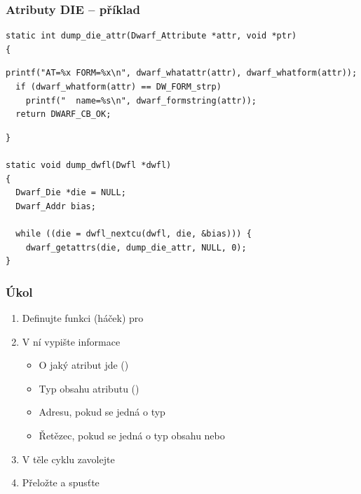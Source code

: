 \begin{frame}[fragile]
  \frametitle{Atributy DIE -- příklad}

  \begin{lstlisting}[belowskip=0pt]
static int dump_die_attr(Dwarf_Attribute *attr, void *ptr)
{
  \end{lstlisting}
  \begin{lstlisting}[aboveskip=0pt,belowskip=0pt]
  printf("AT=%x FORM=%x\n", dwarf_whatattr(attr), dwarf_whatform(attr));
  if (dwarf_whatform(attr) == DW_FORM_strp)
    printf("  name=%s\n", dwarf_formstring(attr));
  return DWARF_CB_OK;
  \end{lstlisting}
  \begin{lstlisting}[aboveskip=0pt]
}

static void dump_dwfl(Dwfl *dwfl)
{
  Dwarf_Die *die = NULL;
  Dwarf_Addr bias;

  while ((die = dwfl_nextcu(dwfl, die, &bias))) {
    dwarf_getattrs(die, dump_die_attr, NULL, 0);
}
  \end{lstlisting}%

\end{frame}

\begin{frame}
  \frametitle{Úkol}

  \begin{enumerate}
    \item Definujte funkci (háček) pro 
    \item V ní vypište informace
    \begin{itemize}
      \item O jaký atribut jde ()
      \item Typ obsahu atributu ()
      \item Adresu, pokud se jedná o typ 
      \item Řetězec, pokud se jedná o typ obsahu  nebo
    \end{itemize}
    \item V těle cyklu  zavolejte 
    \item Přeložte a spusťte
  \end{enumerate}

\end{frame}

